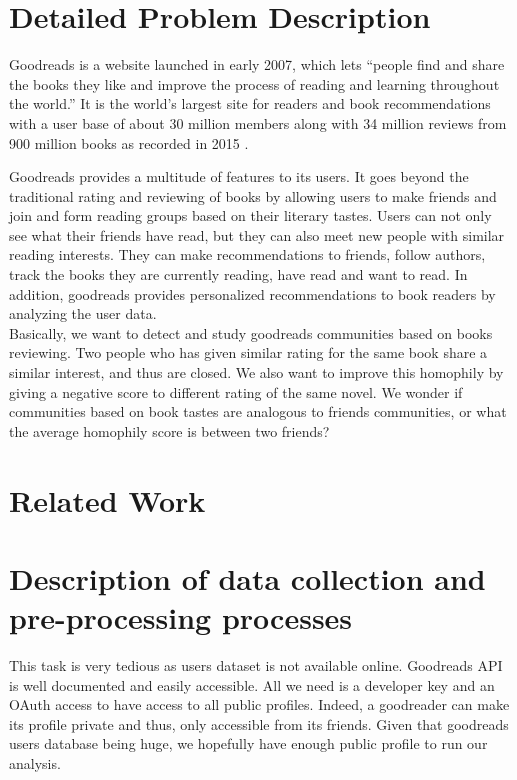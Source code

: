 \documentclass[11pt]{article}
\begin{document}
\maketitle


\section{Detailed Problem Description}
Goodreads is a website launched in early 2007, which lets ``people find and share the books they like and improve the process of reading and learning throughout the world.'' It is the world's largest site for readers and book recommendations with a user base of about 30 million members along with 34 million reviews from 900 million books as recorded in 2015 \cite{goodreads:aboutus}.

Goodreads provides a multitude of features to its users. It goes beyond the traditional rating and reviewing of books by allowing users to make friends and join and form reading groups based on their literary tastes.
Users can not only see what their friends have read, but they can also meet new people with similar reading interests. They can make recommendations to friends, follow authors, track the books they are currently reading, have read and want to read. In addition, goodreads provides personalized recommendations to book readers by analyzing the user data.\\

Basically, we want to detect and study goodreads communities based on books reviewing. Two people who has given similar rating for the same book share a similar interest, and thus are closed. We also want to improve this homophily by giving a negative score to different rating of the same novel.
We wonder if communities based on book tastes are analogous to friends communities, or what the average homophily score is between two friends?


\section{Related Work}


\section{Description of data collection and pre-processing processes}

This task is very tedious as users dataset is not available online. Goodreads API is well documented and easily accessible. All we need is a developer key and an OAuth access to have access to all public profiles. Indeed, a goodreader can make its profile private and thus, only accessible from its friends. Given that goodreads users database being huge, we hopefully have enough public profile to run our analysis.
\end{document}
